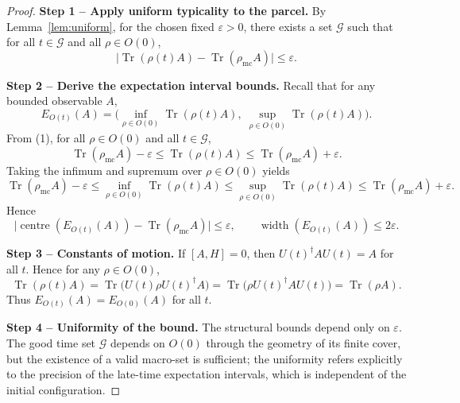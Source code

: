 \documentclass[10pt,a4paper]{amsart}
\begin{document}
\begin{proof}
\textbf{Step 1 -- Apply uniform typicality to the parcel.}  
By Lemma~\ref{lem:uniform}, for the chosen fixed \(\varepsilon>0\), there exists a set \(\mathcal{G}\) such that for all \(t\in\mathcal{G}\) and all \(\rho\in O(0)\),
\[
\bigl|\operatorname{Tr}(\rho(t)A)-\operatorname{Tr}(\rho_{\mathrm{mc}}A)\bigr| \le \varepsilon. \tag{1}
\]

\textbf{Step 2 -- Derive the expectation interval bounds.}  
Recall that for any bounded observable \(A\),
\[
E_{O(t)}(A) = \bigl(\inf_{\rho\in O(0)}\operatorname{Tr}(\rho(t)A),\; \sup_{\rho\in O(0)}\operatorname{Tr}(\rho(t)A)\bigr).
\]
From (1), for all \(\rho\in O(0)\) and all \(t\in\mathcal{G}\),
\[
\operatorname{Tr}(\rho_{\mathrm{mc}}A)-\varepsilon \le \operatorname{Tr}(\rho(t)A) \le \operatorname{Tr}(\rho_{\mathrm{mc}}A)+\varepsilon.
\]
Taking the infimum and supremum over \(\rho\in O(0)\) yields
\[
\operatorname{Tr}(\rho_{\mathrm{mc}}A)-\varepsilon \le \inf_{\rho\in O(0)}\operatorname{Tr}(\rho(t)A) \le \sup_{\rho\in O(0)}\operatorname{Tr}(\rho(t)A) \le \operatorname{Tr}(\rho_{\mathrm{mc}}A)+\varepsilon.
\]
Hence
\[
\bigl|\operatorname{centre}(E_{O(t)}(A))-\operatorname{Tr}(\rho_{\mathrm{mc}}A)\bigr| \le \varepsilon,\qquad
\operatorname{width}(E_{O(t)}(A)) \le 2\varepsilon.
\]

\textbf{Step 3 -- Constants of motion.}  
If \([A,H]=0\), then \(U(t)^\dagger A U(t)=A\) for all \(t\). Hence for any \(\rho\in O(0)\),
\[
\operatorname{Tr}(\rho(t)A) = \operatorname{Tr}\bigl(U(t)\rho U(t)^\dagger A\bigr)
= \operatorname{Tr}\bigl(\rho U(t)^\dagger A U(t)\bigr) = \operatorname{Tr}(\rho A).
\]
Thus \(E_{O(t)}(A)=E_{O(0)}(A)\) for all \(t\).

\textbf{Step 4 -- Uniformity of the bound.}  
The structural bounds depend only on \(\varepsilon\). The good time set \(\mathcal{G}\) depends on \(O(0)\) through the geometry of its finite cover, but the existence of a valid macro-set is sufficient; the uniformity refers explicitly to the precision of the late-time expectation intervals, which is independent of the initial configuration. 
\end{proof}
\end{document}
